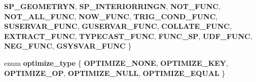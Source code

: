 \begin{DoxyCompactItemize}
{\bfseries S\+P\+\_\+\+G\+E\+O\+M\+E\+T\+R\+YN}, 
{\bfseries S\+P\+\_\+\+I\+N\+T\+E\+R\+I\+O\+R\+R\+I\+N\+GN}, 
\newline
{\bfseries N\+O\+T\+\_\+\+F\+U\+NC}, 
{\bfseries N\+O\+T\+\_\+\+A\+L\+L\+\_\+\+F\+U\+NC}, 
{\bfseries N\+O\+W\+\_\+\+F\+U\+NC}, 
{\bfseries T\+R\+I\+G\+\_\+\+C\+O\+N\+D\+\_\+\+F\+U\+NC}, 
\newline
{\bfseries S\+U\+S\+E\+R\+V\+A\+R\+\_\+\+F\+U\+NC}, 
{\bfseries G\+U\+S\+E\+R\+V\+A\+R\+\_\+\+F\+U\+NC}, 
{\bfseries C\+O\+L\+L\+A\+T\+E\+\_\+\+F\+U\+NC}, 
{\bfseries E\+X\+T\+R\+A\+C\+T\+\_\+\+F\+U\+NC}, 
\newline
{\bfseries T\+Y\+P\+E\+C\+A\+S\+T\+\_\+\+F\+U\+NC}, 
{\bfseries F\+U\+N\+C\+\_\+\+SP}, 
{\bfseries U\+D\+F\+\_\+\+F\+U\+NC}, 
{\bfseries N\+E\+G\+\_\+\+F\+U\+NC}, 
\newline
{\bfseries G\+S\+Y\+S\+V\+A\+R\+\_\+\+F\+U\+NC}
 \}
\item 
\mbox{\label{classItem__func_a680bfeac8aa312f193e89e661199fb3d}} 
enum {\bfseries optimize\+\_\+type} \{ \newline
{\bfseries O\+P\+T\+I\+M\+I\+Z\+E\+\_\+\+N\+O\+NE}, 
{\bfseries O\+P\+T\+I\+M\+I\+Z\+E\+\_\+\+K\+EY}, 
{\bfseries O\+P\+T\+I\+M\+I\+Z\+E\+\_\+\+OP}, 
{\bfseries O\+P\+T\+I\+M\+I\+Z\+E\+\_\+\+N\+U\+LL}, 
\newline
{\bfseries O\+P\+T\+I\+M\+I\+Z\+E\+\_\+\+E\+Q\+U\+AL}
 \}
\end{DoxyCompactItemize}

